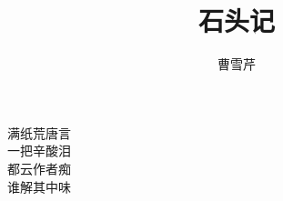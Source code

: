 \documentclass[12pt]{article}
\title{石头记}
\author{曹雪芹}
\date{}
\begin{document}
\maketitle

\begin{center}
满纸荒唐言\\
一把辛酸泪\\
都云作者痴\\
谁解其中味\\
\end{center}
\end{document}
